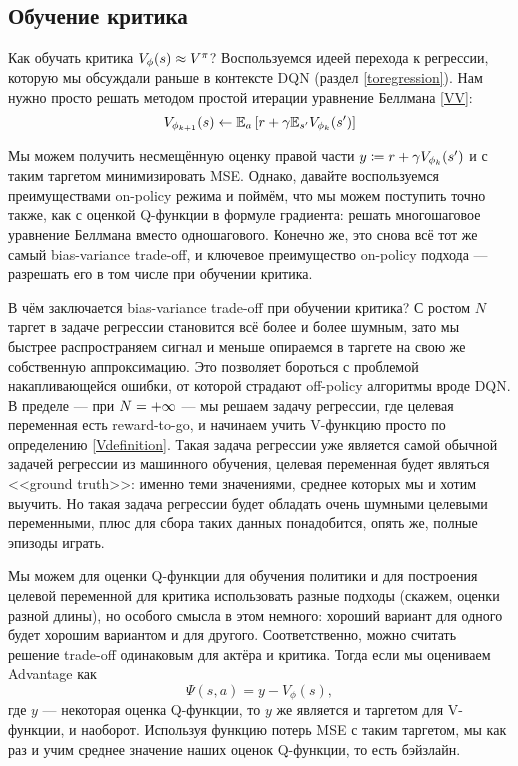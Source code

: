 \subsection{Обучение критика}

Как обучать критика $V_{\phi}(s) \HM\approx V^\pi$? Воспользуемся идеей перехода к регрессии, которую мы обсуждали раньше в контексте DQN (раздел \ref{toregression}). Нам нужно просто решать методом простой итерации уравнение Беллмана \eqref{VV}:
$$V_{\phi_{k+1}}(s) \leftarrow \mathbb{E}_{a} \left[ r + \gamma \mathbb{E}_{s'} V_{\phi_k}(s') \right]$$

Мы можем получить несмещённую оценку правой части $y \HM \coloneqq r \HM+ \gamma V_{\phi_k}(s')$ и с таким таргетом минимизировать MSE. Однако, давайте воспользуемся преимуществами on-policy режима и поймём, что мы можем поступить точно также, как с оценкой Q-функции в формуле градиента: решать многошаговое уравнение Беллмана вместо одношагового. Конечно же, это снова всё тот же самый bias-variance trade-off, и ключевое преимущество on-policy подхода --- разрешать его в том числе при обучении критика. 

В чём заключается bias-variance trade-off при обучении критика? С ростом $N$ таргет в задаче регрессии становится всё более и более шумным, зато мы быстрее распространяем сигнал и меньше опираемся в таргете на свою же собственную аппроксимацию. Это позволяет бороться с проблемой накапливающейся ошибки, от которой страдают off-policy алгоритмы вроде DQN. В пределе --- при $N \HM= +\infty$ --- мы решаем задачу регрессии, где целевая переменная есть reward-to-go, и начинаем учить V-функцию просто по определению \eqref{Vdefinition}. Такая задача регрессии уже является самой обычной задачей регрессии из машинного обучения, целевая переменная будет являться <<ground truth>>: именно теми значениями, среднее которых мы и хотим выучить. Но такая задача регрессии будет обладать очень шумными целевыми переменными, плюс для сбора таких данных понадобится, опять же, полные эпизоды играть.

Мы можем для оценки Q-функции для обучения политики и для построения целевой переменной для критика использовать разные подходы (скажем, оценки разной длины), но особого смысла в этом немного: хороший вариант для одного будет хорошим вариантом и для другого. Соответственно, можно считать решение trade-off одинаковым для актёра и критика. Тогда если мы оцениваем Advantage как
$$\Psi(s, a) = y - V_{\phi}(s),$$
где $y$ --- некоторая оценка Q-функции, то $y$ же является и таргетом для V-функции, и наоборот. Используя функцию потерь MSE с таким таргетом, мы как раз и учим среднее значение наших оценок Q-функции, то есть бэйзлайн.

